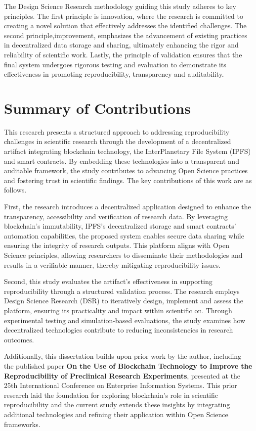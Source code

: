 \documentclass{article}
\begin{document}
The Design Science Research methodology guiding this study adheres to key principles. The first principle is innovation, where the research is committed to creating a novel solution that effectively addresses the identified challenges. The second principle,improvement, emphasizes the advancement of existing practices in decentralized data storage and sharing, ultimately enhancing the rigor and reliability of scientific work. Lastly, the principle of validation ensures that the final system undergoes rigorous testing and evaluation to demonstrate its effectiveness in promoting reproducibility, transparency and auditability.

\section{Summary of Contributions}

This research presents a structured approach to addressing reproducibility challenges in scientific research through the development of a decentralized artifact integrating blockchain technology, the InterPlanetary File System (IPFS) and smart contracts. By embedding these technologies into a transparent and auditable framework, the study contributes to advancing Open Science practices and fostering trust in scientific findings. The key contributions of this work are as follows.

First, the research introduces a decentralized application designed to enhance the transparency, accessibility and verification of research data. By leveraging blockchain's immutability, IPFS’s decentralized storage and smart contracts’ automation capabilities, the proposed system enables secure data sharing while ensuring the integrity of research outputs. This platform aligns with Open Science principles, allowing researchers to disseminate their methodologies and results in a verifiable manner, thereby mitigating reproducibility issues.

Second, this study evaluates the artifact’s effectiveness in supporting reproducibility through a structured validation process. The research employs Design Science Research (DSR) to iteratively design, implement and assess the platform, ensuring its practicality and impact within scientific on. Through experimental testing and simulation-based evaluations, the study examines how decentralized technologies contribute to reducing inconsistencies in research outcomes.

Additionally, this dissertation builds upon prior work by the author, including the published paper \textbf{On the Use of Blockchain Technology to Improve the Reproducibility of Preclinical Research Experiments}\cite{oliveira2023blockchain}, presented at the 25th International Conference on Enterprise Information Systems. This prior research laid the foundation for exploring blockchain’s role in scientific reproducibility and the current study extends these insights by integrating additional technologies and refining their application within Open Science frameworks.
\end{document}
